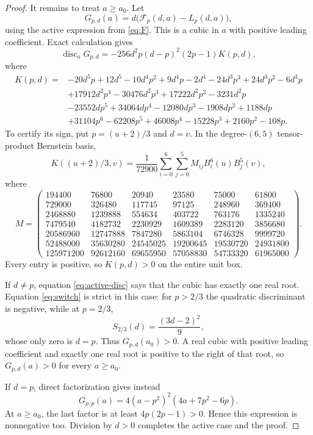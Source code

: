 \documentclass[11pt]{article}
\begin{document}
\begin{proof}
It remains to treat $a\ge a_0$.  Let
\[
 G_{p,d}(a)=d\bigl(\mathcal F_p(d,a)-L_p(d,a)\bigr),
\]
using the active expression from \eqref{eq:F}.  This is a cubic in $a$ with
positive leading coefficient.  Exact calculation gives
\begin{equation}
 \operatorname{disc}_aG_{p,d}
 =-256d^2p(d-p)^2(2p-1)K(p,d),
 \label{eq:active-disc}
\end{equation}
where
\begin{align*}
K(p,d)={}&-20d^5p+12d^5-10d^4p^2+9d^4p-2d^4
 -24d^3p^3+24d^3p^2-6d^3p\\
&+17912d^2p^4-30476d^2p^3+17222d^2p^2-3231d^2p\\
&-23552dp^5+34064dp^4-12080dp^3-1908dp^2+1188dp\\
&+31104p^6-62208p^5+46008p^4-15228p^3+2160p^2-108p.
\end{align*}
To certify its sign, put $p=(u+2)/3$ and $d=v$.  In the degree-$(6,5)$
tensor-product Bernstein basis,
\[
 K((u+2)/3,v)=\frac1{72900}
 \sum_{i=0}^6\sum_{j=0}^5M_{ij}B_i^6(u)B_j^5(v),
\]
where
\[
M=\begin{pmatrix}
194400&76800&20940&23580&75000&61800\\
729000&326480&117745&97125&248960&369400\\
2468880&1239888&554634&403722&763176&1335240\\
7479540&4182732&2230929&1609389&2283120&3856680\\
20586960&12747888&7847280&5863104&6746328&9999720\\
52488000&35630280&24545025&19200645&19530720&24931800\\
125971200&92612160&69655950&57058830&54733320&61965000
\end{pmatrix}.
\]
Every entry is positive, so $K(p,d)>0$ on the entire unit box.

If $d\ne p$, equation \eqref{eq:active-disc} says that the cubic has
exactly one real root.  Equation \eqref{eq:switch} is strict in this case:
for $p>2/3$ the quadratic discriminant is negative, while at $p=2/3$,
\[
 S_{2/3}(d)=\frac{(3d-2)^2}{9},
\]
whose only zero is $d=p$.  Thus $G_{p,d}(a_0)>0$.  A real cubic with
positive leading coefficient and exactly one real root is positive to the
right of that root, so $G_{p,d}(a)>0$ for every $a\ge a_0$.

If $d=p$, direct factorization gives instead
\[
 G_{p,p}(a)=4(a-p^2)^2(4a+7p^2-6p).
\]
At $a\ge a_0$, the last factor is at least $4p(2p-1)>0$.  Hence this
expression is nonnegative too.  Division by $d>0$ completes the active
case and the proof.
\end{proof}
\end{document}
